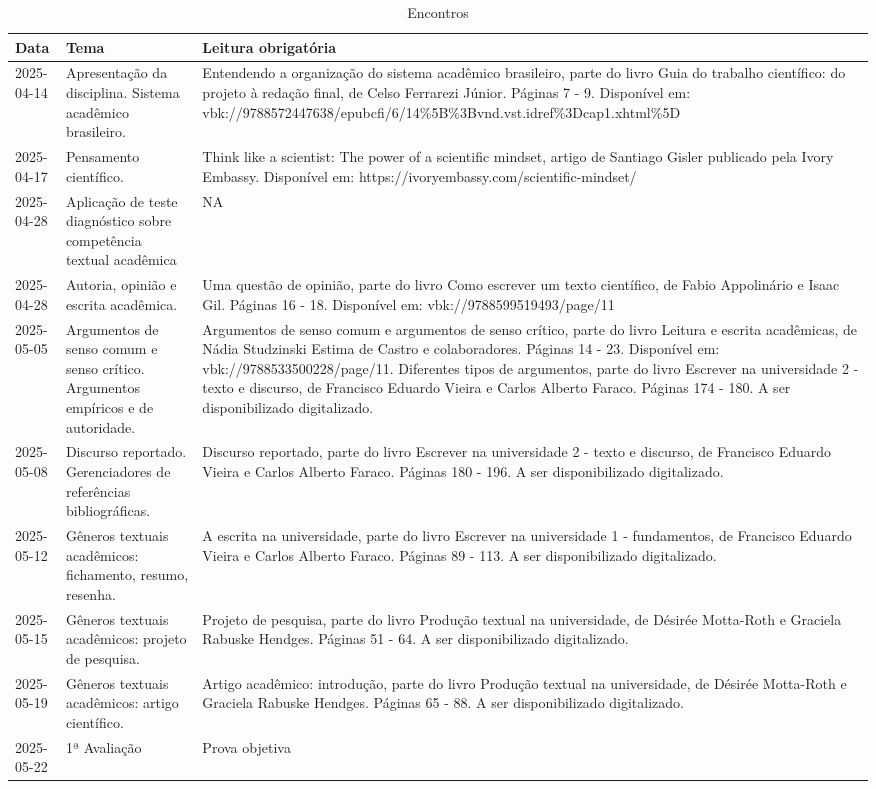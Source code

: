 \documentclass[
]{book}
\begin{document}
\begin{table}

\caption{\label{tab:unnamed-chunk-1}Encontros}
\centering
\begin{tabular}[t]{l|l|l}
\hline
Data & Tema & Leitura obrigatória\\
\hline
2025-04-14 & Apresentação da disciplina. Sistema acadêmico brasileiro. & Entendendo a organização do sistema acadêmico brasileiro, parte do livro Guia do trabalho científico: do projeto à redação final, de Celso Ferrarezi Júnior. Páginas 7 - 9. Disponível em: vbk://9788572447638/epubcfi/6/14\%5B\%3Bvnd.vst.idref\%3Dcap1.xhtml\%5D\\
\hline
2025-04-17 & Pensamento científico. & Think like a scientist: The power of a scientific mindset, artigo de Santiago Gisler publicado pela Ivory Embassy. Disponível em: https://ivoryembassy.com/scientific-mindset/\\
\hline
2025-04-28 & Aplicação de teste diagnóstico sobre competência textual acadêmica & NA\\
\hline
2025-04-28 & Autoria, opinião e escrita acadêmica. & Uma questão de opinião, parte do livro Como escrever um texto científico, de Fabio Appolinário e Isaac Gil. Páginas 16 - 18. Disponível em: vbk://9788599519493/page/11\\
\hline
2025-05-05 & Argumentos de senso comum e senso crítico. Argumentos empíricos e de autoridade. & Argumentos de senso comum e argumentos de senso crítico, parte do livro Leitura e escrita acadêmicas, de Nádia Studzinski Estima de Castro e colaboradores. Páginas 14 - 23. Disponível em: vbk://9788533500228/page/11. Diferentes tipos de argumentos, parte do livro Escrever na universidade 2 - texto e discurso, de Francisco Eduardo Vieira e Carlos Alberto Faraco. Páginas 174 - 180. A ser disponibilizado digitalizado.\\
\hline
2025-05-08 & Discurso reportado. Gerenciadores de referências bibliográficas. & Discurso reportado, parte do livro Escrever na universidade 2 - texto e discurso, de Francisco Eduardo Vieira e Carlos Alberto Faraco. Páginas 180 - 196. A ser disponibilizado digitalizado.\\
\hline
2025-05-12 & Gêneros textuais acadêmicos: fichamento, resumo, resenha. & A escrita na universidade, parte do livro Escrever na universidade 1 - fundamentos, de Francisco Eduardo Vieira e Carlos Alberto Faraco. Páginas 89 - 113. A ser disponibilizado digitalizado.\\
\hline
2025-05-15 & Gêneros textuais acadêmicos: projeto de pesquisa. & Projeto de pesquisa, parte do livro Produção textual na universidade, de Désirée Motta-Roth e Graciela Rabuske Hendges. Páginas 51 - 64. A ser disponibilizado digitalizado.\\
\hline
2025-05-19 & Gêneros textuais acadêmicos: artigo científico. & Artigo acadêmico: introdução, parte do livro Produção textual na universidade, de Désirée Motta-Roth e Graciela Rabuske Hendges. Páginas 65 - 88. A ser disponibilizado digitalizado.\\
\hline
2025-05-22 & 1ª Avaliação & Prova objetiva\\
\hline
\end{tabular}
\end{table}
\end{document}
